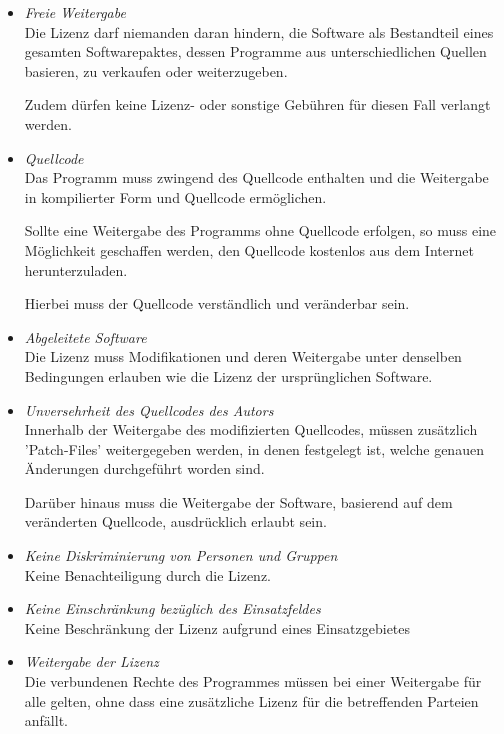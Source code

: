 \begin{itemize}
    \item \textit{Freie Weitergabe}\\
    Die Lizenz darf niemanden daran hindern, die Software als Bestandteil eines gesamten Softwarepaktes, dessen Programme aus unterschiedlichen Quellen basieren, zu verkaufen oder weiterzugeben. 

    Zudem dürfen keine Lizenz- oder sonstige Gebühren für diesen Fall verlangt werden. 

    \item \textit{Quellcode}\\
    Das Programm muss zwingend des Quellcode enthalten und die Weitergabe in kompilierter Form und Quellcode ermöglichen. 

    Sollte eine Weitergabe des Programms ohne Quellcode erfolgen, so muss eine Möglichkeit geschaffen werden, den Quellcode kostenlos aus dem Internet herunterzuladen. 
    
    Hierbei muss der Quellcode verständlich und veränderbar sein. 

    \item \textit{Abgeleitete Software}\\
    Die Lizenz muss Modifikationen und deren Weitergabe unter denselben Bedingungen erlauben wie die Lizenz der ursprünglichen Software. 

    \item \textit{Unversehrheit des Quellcodes des Autors}\\
    Innerhalb der Weitergabe des modifizierten Quellcodes, müssen zusätzlich 'Patch-Files' weitergegeben werden, in denen festgelegt ist, welche genauen Änderungen durchgeführt worden sind. 

    Darüber hinaus muss die Weitergabe der Software, basierend auf dem veränderten Quellcode, ausdrücklich erlaubt sein. 

    \item \textit{Keine Diskriminierung von Personen und Gruppen}\\
    Keine Benachteiligung durch die Lizenz.
    
    \item \textit{Keine Einschränkung bezüglich des Einsatzfeldes}\\
    Keine Beschränkung der Lizenz aufgrund eines Einsatzgebietes  

    \item \textit{Weitergabe der Lizenz}\\
    Die verbundenen Rechte des Programmes müssen bei einer Weitergabe für alle gelten, ohne dass eine zusätzliche Lizenz für die betreffenden Parteien anfällt. 
    

\end{itemize}
